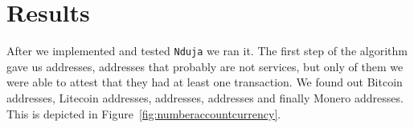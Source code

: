 \newcommand{\accountGitlab}{2}

\newcommand{\accountBitbucket}{1}


\section{Results} \label{results}
After we implemented and tested \texttt{Nduja} we ran it. The first step of the
algorithm gave us \startingNumberAllWallets{} addresses,
\startingNumberWalletsNotService{} addresses that probably are not services,
but only \startingNumberWalletsAtLeastOneTransaction{} of them we were able to
attest that they had at least one transaction. We found out \startingBTC{}
Bitcoin addresses, \startingLTC{} Litecoin addresses, \startingDOGE{}
addresses, \startingETH{} addresses and finally \startingXMR{} Monero
addresses. This is depicted in Figure~\ref{fig:numberaccountcurrency}.


